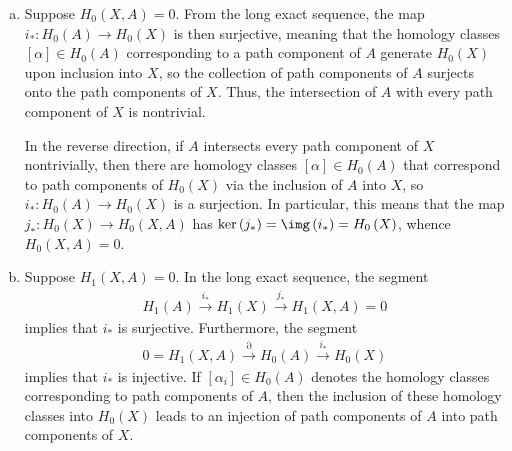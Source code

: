 \documentclass[10pt]{mypackage}
\begin{document}
\begin{solution}\hfill
  \begin{enumerate}[(a)]
    \item Suppose $H_0\left( X,A \right) = 0$. From the long exact sequence, the map $i_{\ast}\colon H_0\left( A \right)\rightarrow H_0\left( X \right)$ is then surjective, meaning that the homology classes $\left[ \alpha \right]\in H_0\left( A \right)$ corresponding to a path component of $A$ generate $H_0\left( X \right)$ upon inclusion into $X$, so the collection of path components of $A$ surjects onto the path components of $X$. Thus, the intersection of $A$ with every path component of $X$ is nontrivial.

      In the reverse direction, if $A$ intersects every path component of $X$ nontrivially, then there are homology classes $\left[ \alpha \right]\in H_0\left( A \right)$ that correspond to path components of $H_0\left( X \right)$ via the inclusion of $A$ into $X$, so $i_{\ast}\colon H_0\left( A \right)\rightarrow H_0\left( X \right)$ is a surjection. In particular, this means that the map $j_{\ast}\colon H_0\left( X \right)\rightarrow H_0\left( X,A \right)$ has $\ker\left( j_{\ast} \right) = \img\left( i_{\ast} \right) = H_0\left( X \right)$, whence $H_0\left( X,A \right) = 0$.
    \item Suppose $H_1\left( X,A \right) = 0$. In the long exact sequence, the segment 
      \begin{align*}
        H_1\left( A \right)\xrightarrow{i_{\ast}} H_1\left( X \right)\xrightarrow{j_{\ast}} H_1\left( X,A \right) = 0
      \end{align*}
      implies that $i_{\ast}$ is surjective. Furthermore, the segment
      \begin{align*}
        0 = H_1\left( X,A \right)\xrightarrow{\partial}H_0\left( A \right)\xrightarrow{i_{\ast}}H_0\left( X \right)
      \end{align*}
      implies that $i_{\ast}$ is injective. If $\left[ \alpha_i \right]\in H_0\left( A \right)$ denotes the homology classes corresponding to path components of $A$, then the inclusion of these homology classes into $H_0\left( X \right)$ leads to an injection of path components of $A$ into path components of $X$.


\end{enumerate}
\end{solution}
\end{document}
